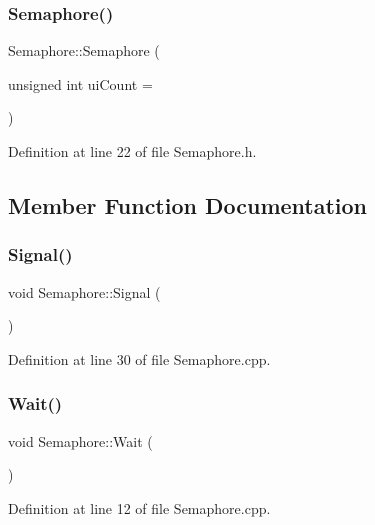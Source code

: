 \subsubsection{\texorpdfstring{Semaphore()}{Semaphore()}}
{\footnotesize\ttfamily Semaphore\+::\+Semaphore (\begin{DoxyParamCaption}\item[{unsigned int}]{ui\+Count = {} }\end{DoxyParamCaption})\hspace{0.3cm}{\ttfamily [inline]}}



Definition at line 22 of file Semaphore.\+h.



\subsection{Member Function Documentation}
\mbox{\label{class_semaphore_a86f92f738b4486439b296d8e235895f2}} 
\subsubsection{\texorpdfstring{Signal()}{Signal()}}
{\footnotesize\ttfamily void Semaphore\+::\+Signal (\begin{DoxyParamCaption}{ }\end{DoxyParamCaption})}



Definition at line 30 of file Semaphore.\+cpp.

\mbox{\label{class_semaphore_a72aabebf026e3a8b1f3e4d0fa8ee1eda}} 
\subsubsection{\texorpdfstring{Wait()}{Wait()}\hspace{0.1cm}{\footnotesize\ttfamily [1/2]}}
{\footnotesize\ttfamily void Semaphore\+::\+Wait (\begin{DoxyParamCaption}{ }\end{DoxyParamCaption})}



Definition at line 12 of file Semaphore.\+cpp.

